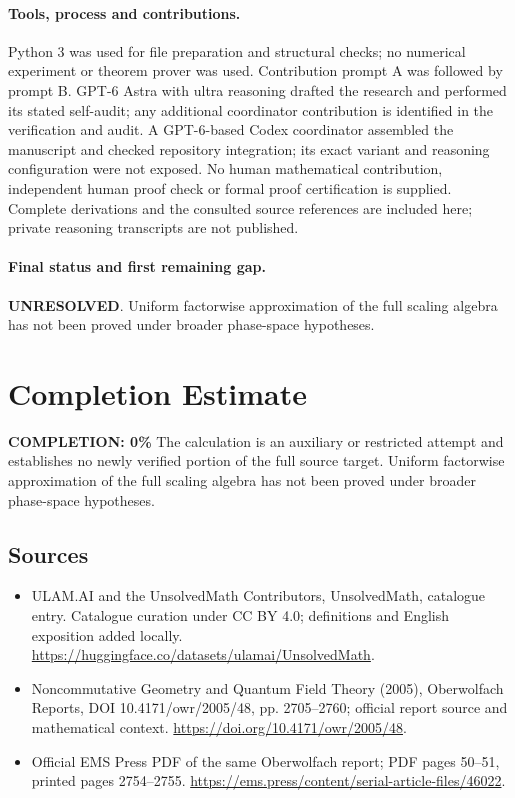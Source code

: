 \documentclass[11pt]{article}
\begin{document}
\paragraph{Tools, process and contributions.}
Python 3 was used for file preparation and structural checks; no numerical experiment or theorem prover was used. Contribution prompt A was followed by prompt B. GPT-6 Astra with ultra reasoning drafted the research and performed its stated self-audit; any additional coordinator contribution is identified in the verification and audit. A GPT-6-based Codex coordinator assembled the manuscript and checked repository integration; its exact variant and reasoning configuration were not exposed. No human mathematical contribution, independent human proof check or formal proof certification is supplied. Complete derivations and the consulted source references are included here; private reasoning transcripts are not published.

\paragraph{Final status and first remaining gap.}
\textbf{UNRESOLVED}. Uniform factorwise approximation of the full scaling algebra has not been proved under broader phase-space hypotheses.

\section{Completion Estimate}
\noindent\textbf{COMPLETION: 0\%}
The calculation is an auxiliary or restricted attempt and establishes no newly verified portion of the full source target. Uniform factorwise approximation of the full scaling algebra has not been proved under broader phase-space hypotheses.

\subsection{Sources}
\begin{itemize}
\item[\hypertarget{source:statement:1}{S1}] ULAM.AI and the UnsolvedMath Contributors, UnsolvedMath, catalogue entry. Catalogue curation under CC BY 4.0; definitions and English exposition added locally.
\url{https://huggingface.co/datasets/ulamai/UnsolvedMath}.
\item[\hypertarget{source:statement:2}{S2}] Noncommutative Geometry and Quantum Field Theory (2005), Oberwolfach Reports, DOI 10.4171/owr/2005/48, pp. 2705--2760; official report source and mathematical context.
\url{https://doi.org/10.4171/owr/2005/48}.
\item[\hypertarget{source:statement:3}{S3}] Official EMS Press PDF of the same Oberwolfach report; PDF pages 50--51, printed pages 2754--2755.
\url{https://ems.press/content/serial-article-files/46022}.
\end{itemize}
\label{end:statement}
\end{document}
